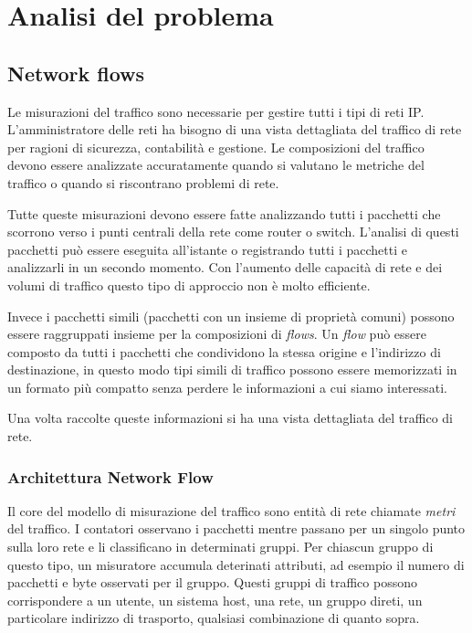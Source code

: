 \documentclass[../main.tex]{subfiles}
\begin{document}
\chapter{Analisi del problema}

\section{Network flows}


Le misurazioni del traffico sono necessarie per gestire tutti i tipi di reti IP. L'amministratore delle reti ha bisogno di una vista dettagliata del traffico di rete per ragioni di sicurezza, contabilità e gestione. Le composizioni del traffico devono essere analizzate accuratamente quando si valutano le metriche del traffico o quando si riscontrano problemi di rete.

Tutte queste misurazioni devono essere fatte analizzando tutti i pacchetti che scorrono verso i punti centrali della rete come router o switch. L'analisi di questi pacchetti può essere eseguita all'istante o registrando tutti i pacchetti e analizzarli in un secondo momento. Con l'aumento delle capacità di rete e dei volumi di traffico questo tipo di approccio non è molto efficiente. 

Invece i pacchetti simili (pacchetti con un insieme di proprietà comuni) possono essere raggruppati insieme per la composizioni di \textit{flows}. Un \textit{flow} può essere composto da tutti i pacchetti che condividono la stessa origine e l'indirizzo di destinazione, in questo modo tipi simili di traffico possono essere memorizzati in un formato più compatto senza perdere le informazioni a cui siamo interessati.

Una volta raccolte queste informazioni si ha una vista dettagliata del traffico di rete. 

\subsection{Architettura Network Flow}
Il core del modello di misurazione del traffico sono entità di rete chiamate \textit{metri} del traffico. I contatori osservano i pacchetti mentre passano per un singolo punto sulla loro rete e li classificano in determinati gruppi. Per chiascun gruppo di questo tipo, un misuratore accumula deterinati attributi, ad esempio il numero di pacchetti e byte osservati per il gruppo. Questi gruppi di traffico possono corrispondere a un utente, un sistema host, una rete, un gruppo direti, un particolare indirizzo di trasporto, qualsiasi combinazione di quanto sopra. \newline
\end{document}
